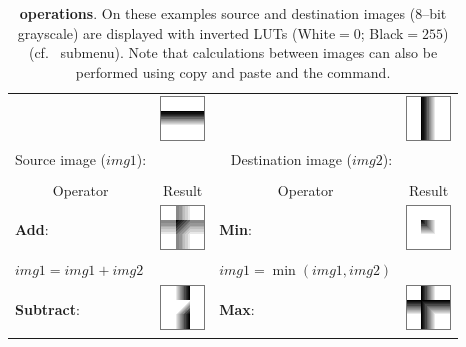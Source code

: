 \begin{table}[h]
\noindent \caption[Image operations]{\textbf{\label{tab:ImgCalculator}}\textsf{\textbf{}}\textbf{
operations}.\textbf{ }On these examples source and destination images
(8--bit grayscale) are displayed with inverted LUTs (White$=0$; Black$=255$)
(cf.\ \protect{}
submenu). Note that calculations between images can also be performed
using copy and paste and the \protect{}
command.}


\noindent %
\begin{tabular}{llll}
\addlinespace
 & \multirow{1}{*}{\includegraphics[scale=0.75]{images/ImgCalculator/Source}} &  & \multirow{1}{*}{\includegraphics[scale=0.75]{images/ImgCalculator/Destination}}\tabularnewline
\multicolumn{1}{r}{Source image ($img1$):} &  & \multicolumn{1}{r}{Destination image ($img2$):} & \tabularnewline
 &  &  & \tabularnewline
\midrule 
\multicolumn{1}{c}{Operator} & \multicolumn{1}{c}{Result} & \multicolumn{1}{c}{Operator} & \multicolumn{1}{c}{Result}\tabularnewline
\midrule
\addlinespace
\addlinespace
\textbf{Add}: & \multirow{1}{*}{\includegraphics[scale=0.75]{images/ImgCalculator/Add}} & \textbf{Min}: & \multirow{1}{*}{\includegraphics[scale=0.75]{images/ImgCalculator/Min}}\tabularnewline
\quad{} $img1=img1+img2$ &  & \quad{} $img1=\min(img1,img2)$ & \tabularnewline\addlinespace
\addlinespace
\textbf{Subtract}: & \multirow{1}{*}{\includegraphics[scale=0.75]{images/ImgCalculator/Subtract}} & \textbf{Max}: & \multirow{1}{*}{\includegraphics[scale=0.75]{images/ImgCalculator/Max}}\tabularnewline

\end{tabular}
\end{table}
